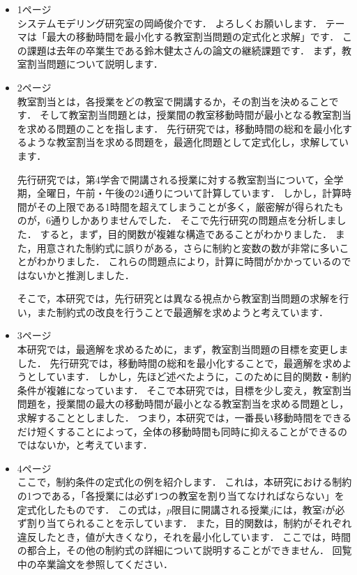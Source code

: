 \documentclass{jsarticle}
\begin{document}
\begin{itemize}
\item 1ページ\\
システムモデリング研究室の岡崎俊介です．
よろしくお願いします．
テーマは「最大の移動時間を最小化する教室割当問題の定式化と求解」です．
この課題は去年の卒業生である鈴木健太さんの論文の継続課題です．
まず，教室割当問題について説明します．\\

\item 2ページ\\
教室割当とは，各授業をどの教室で開講するか，その割当を決めることです．
そして教室割当問題とは，授業間の教室移動時間が最小となる教室割当を求める問題のことを指します．
先行研究では，移動時間の総和を最小化するような教室割当を求める問題を，最適化問題として定式化し，求解しています．

先行研究では，第4学舎で開講される授業に対する教室割当について，全学期，全曜日，午前・午後の24通りについて計算しています．
しかし，計算時間がその上限である1時間を超えてしまうことが多く，厳密解が得られたものが，6通りしかありませんでした．
そこで先行研究の問題点を分析しました．
すると，まず，目的関数が複雑な構造であることがわかりました．
また，用意された制約式に誤りがある，さらに制約と変数の数が非常に多いことがわかりました．
これらの問題点により，計算に時間がかかっているのではないかと推測しました．

そこで，本研究では，先行研究とは異なる視点から教室割当問題の求解を行い，また制約式の改良を行うことで最適解を求めようと考えています．


\item 3ページ\\
本研究では，最適解を求めるために，まず，教室割当問題の目標を変更しました．
先行研究では，移動時間の総和を最小化することで，最適解を求めようとしています．
しかし，先ほど述べたように，このために目的関数・制約条件が複雑になっています．
そこで本研究では，目標を少し変え，教室割当問題を，授業間の最大の移動時間が最小となる教室割当を求める問題とし，求解することとしました．
つまり，本研究では，一番長い移動時間をできるだけ短くすることによって，全体の移動時間も同時に抑えることができるのではないか，と考えています．


\item 4ページ\\
ここで，制約条件の定式化の例を紹介します．
これは，本研究における制約の1つである，「各授業には必ず1つの教室を割り当てなければならない」を定式化したものです．
この式は，$p$限目に開講される授業$j$には，教室$i$が必ず割り当てられることを示しています．
また，目的関数は，制約がそれぞれ違反したとき，値が大きくなり，それを最小化しています．
ここでは，時間の都合上，その他の制約式の詳細について説明することができません．
回覧中の卒業論文を参照してください．


\end{itemize}
\end{document}
